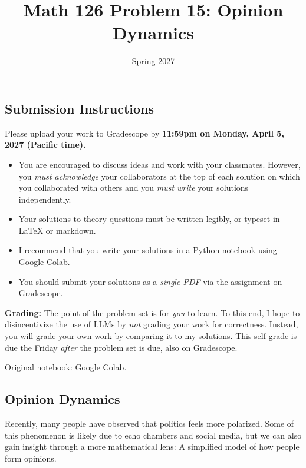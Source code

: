 \documentclass{article}
\title{Math 126 Problem 15: Opinion Dynamics}
\author{} %
\date{Spring 2027}
\begin{document}
\maketitle

\hypertarget{submission-instructions}{%
\subsection*{Submission Instructions}\label{submission-instructions}}

Please upload your work to Gradescope by \textbf{11:59pm on Monday, April 5, 2027 (Pacific time).}

\begin{itemize}
\item
  You are encouraged to discuss ideas and work with your classmates. However, you \emph{must acknowledge} your collaborators at the top of each solution on which you collaborated with others and you \emph{must write} your solutions independently.
\item
  Your solutions to theory questions must be written legibly, or typeset in LaTeX or markdown.
\item
  I recommend that you write your solutions in a Python notebook using Google Colab.
\item
  You should submit your solutions as a \emph{single PDF} via the assignment on Gradescope.
\end{itemize}

\textbf{Grading:} The point of the problem set is for \emph{you} to learn. To this end, I hope to disincentivize the use of LLMs by \emph{not} grading your work for correctness. Instead, you will grade your own work by comparing it to my solutions. This self-grade is due the Friday \emph{after} the problem set is due, also on Gradescope.

\noindent Original notebook: \href{https://colab.research.google.com/drive/1KeC2s6iVbQB8S1OCRjM20xiq5wwbiOtJ?usp=sharing}{Google Colab}.

\hypertarget{opinion-dynamics}{%
\subsection*{Opinion Dynamics}\label{opinion-dynamics}}

Recently, many people have observed that politics feels more polarized. Some of this phenomenon is likely due to echo chambers and social media, but we can also gain insight through a more mathematical lens: A simplified model of how people form opinions.
\end{document}

